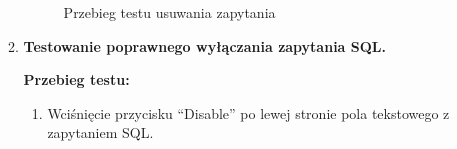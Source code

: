 \begin{enumerate}
\begin{enumerate}
\begin{figure}[h]
                    \medspace

                    \caption{Przebieg testu usuwania zapytania}
                    \label{blockDeletionManualTest}
                \end{figure}

                \FloatBarrier

            \item \textbf{Testowanie poprawnego wyłączania zapytania SQL.}

                \textbf{Przebieg testu:}

                \begin{enumerate}

                    \item Wciśnięcie przycisku ``Disable'' po lewej stronie pola
                        tekstowego z zapytaniem SQL.


\end{enumerate}
\end{enumerate}
\end{enumerate}
